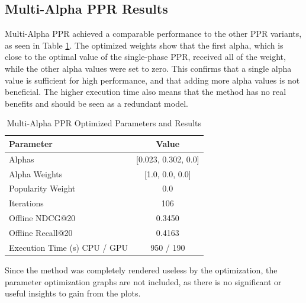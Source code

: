 \documentclass[conference,compsoc]{IEEEtran}
\begin{document}
\subsection{Multi-Alpha PPR Results}
Multi-Alpha PPR achieved a comparable performance to the other PPR variants, as seen in Table \ref{tab:mappr_results}. The optimized weights show that the first alpha, which is close to the optimal value of the single-phase PPR, received all of the weight, while the other alpha values were set to zero. This confirms that a single alpha value is sufficient for high performance, and that adding more alpha values is not beneficial. The higher execution time also means that the method has no real benefits and should be seen as a redundant model.
\begin{table}[!ht]
    \centering
    \caption{Multi-Alpha PPR Optimized Parameters and Results}
        \label{tab:mappr_results}
    \begin{tabular}{lc}
    \toprule
    \textbf{Parameter} & \textbf{Value} \\
    \midrule
     Alphas & [0.023, 0.302, 0.0] \\
     Alpha Weights & [1.0, 0.0, 0.0] \\
     Popularity Weight & 0.0 \\
     Iterations & 106 \\
      Offline NDCG@20 & 0.3450 \\
    Offline Recall@20 & 0.4163 \\
    Execution Time (s) CPU / GPU & 950 / 190 \\
    \bottomrule
    \end{tabular}
\end{table}
Since the method was completely rendered useless by the optimization, the parameter optimization graphs are not included, as there is no significant or useful insights to gain from the plots.
\end{document}
